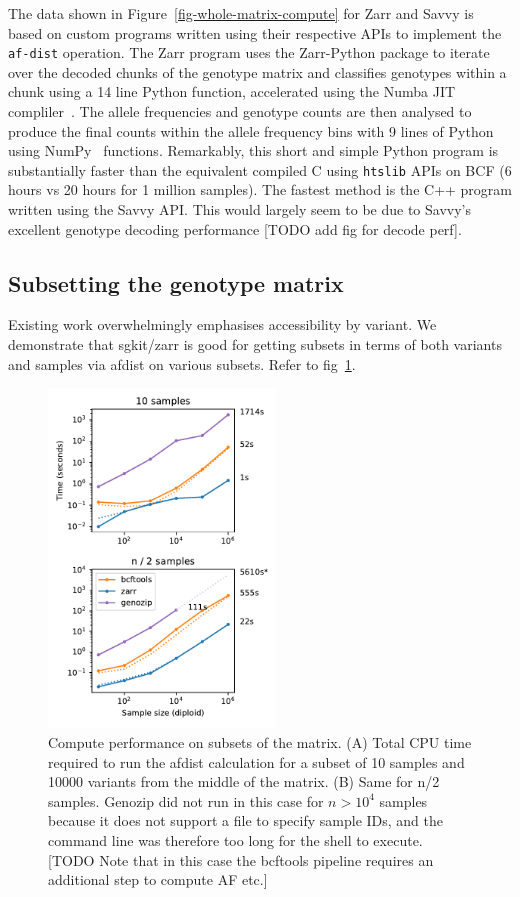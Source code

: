 \documentclass[a4paper,num-refs]{oup-contemporary}
\begin{document}
The data shown in Figure~\ref{fig-whole-matrix-compute} for Zarr and Savvy
is based on custom programs written using their respective APIs
to implement the \texttt{af-dist} operation. The Zarr program uses
the Zarr-Python package to iterate over the decoded chunks of the 
genotype matrix and classifies genotypes within a chunk using a 14 line Python
function, accelerated using the Numba JIT compliler~\cite{lam2015numba}.
The allele frequencies and genotype counts are then analysed to produce 
the final counts within the allele frequency bins with 9 lines of 
Python using NumPy~\cite{harris2020array} functions. Remarkably, this 
short and simple Python program is substantially faster than the 
equivalent compiled C using \texttt{htslib} APIs on BCF (6 hours
vs 20 hours for 1 million samples). The fastest method is the 
C++ program written using the Savvy API. This would largely seem
to be due to Savvy's excellent genotype decoding performance
[TODO add fig for decode perf].

\subsection{Subsetting the genotype matrix}
Existing work overwhelmingly emphasises accessibility by variant.
We demonstrate that sgkit/zarr is good for getting subsets
in terms of both variants and samples via afdist on various subsets.
Refer to fig~\ref{fig-subset-matrix-compute}.

\begin{figure}
\includegraphics[width=6cm]{figures/subset-matrix-compute}
\caption{Compute performance on subsets of the matrix.
(A) Total CPU time required to run the afdist calculation for
a subset of 10 samples and 10000 variants from the middle of the matrix.
(B) Same for n/2 samples. Genozip did not run in this case for
$n > 10^4$ samples because it does not support a file to specify
sample IDs, and the command line was therefore too long for the shell
to execute. [TODO Note that in this case the bcftools pipeline requires
an additional step to compute AF etc.]
\label{fig-subset-matrix-compute}}
\end{figure}
\end{document}
